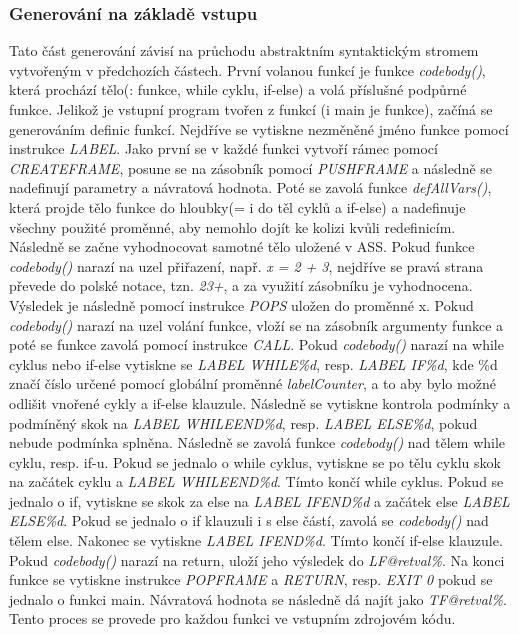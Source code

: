 \documentclass[a4paper, 12pt]{article}
\begin{document}
\subsubsection{Generování na základě vstupu}
Tato část generování závisí na průchodu abstraktním syntaktickým stromem vytvořeným v předchozích částech. První volanou funkcí je funkce \textit{codebody()}, která prochází tělo(: funkce, while cyklu, if-else) a volá příslušné podpůrné funkce. Jelikož je vstupní program tvořen z funkcí (i main je funkce), začíná se generováním definic funkcí. Nejdříve se vytiskne nezměněné jméno funkce pomocí instrukce \textit{LABEL}. Jako první se v každé funkci vytvoří rámec pomocí \textit{CREATEFRAME}, posune se na zásobník pomocí \textit{PUSHFRAME} a následně se nadefinují parametry a návratová hodnota. Poté se zavolá funkce \textit{defAllVars()}, která projde tělo funkce do hloubky(= i do těl cyklů a if-else) a nadefinuje všechny použité proměnné, aby nemohlo dojít ke kolizi kvůli redefinicím. Následně se začne vyhodnocovat samotné tělo uložené v ASS. Pokud funkce \textit{codebody()} narazí na uzel přiřazení, např. \textit{x = 2 + 3}, nejdříve se pravá strana převede do polské notace, tzn. \textit{23+}, a za využití zásobníku je vyhodnocena. Výsledek je následně pomocí instrukce \textit{POPS} uložen do proměnné x. Pokud \textit{codebody()} narazí na uzel volání funkce, vloží se na zásobník argumenty funkce a poté se funkce zavolá pomocí instrukce \textit{CALL}. Pokud \textit{codebody()} narazí na while cyklus nebo if-else vytiskne se \textit{LABEL WHILE\%d}, resp. \textit{LABEL IF\%d}, kde \%d značí číslo určené pomocí globální proměnné \textit{labelCounter}, a to aby bylo možné odlišit vnořené cykly a if-else klauzule. Následně se vytiskne kontrola podmínky a podmíněný skok na \textit{LABEL WHILEEND\%d}, resp. \textit{LABEL ELSE\%d}, pokud nebude podmínka splněna. Následně se zavolá funkce \textit{codebody()} nad tělem while cyklu, resp. if-u. Pokud se jednalo o while cyklus, vytiskne se po tělu cyklu skok na začátek cyklu a \textit{LABEL WHILEEND\%d}. Tímto končí while cyklus. Pokud se jednalo o if, vytiskne se skok za else na \textit{LABEL IFEND\%d} a začátek else \textit{LABEL ELSE\%d}. Pokud se jednalo o if klauzuli i s else částí, zavolá se \textit{codebody()} nad tělem else. Nakonec se vytiskne \textit{LABEL IFEND\%d}. Tímto končí if-else klauzule. Pokud \textit{codebody()} narazí na return, uloží jeho výsledek do \textit{LF@retval\%}. Na konci funkce se vytiskne instrukce \textit{POPFRAME} a \textit{RETURN}, resp. \textit{EXIT 0} pokud se jednalo o funkci main. Návratová hodnota se následně dá najít jako \textit{TF@retval\%}. Tento proces se provede pro každou funkci ve vstupním zdrojovém kódu.
\end{document}
